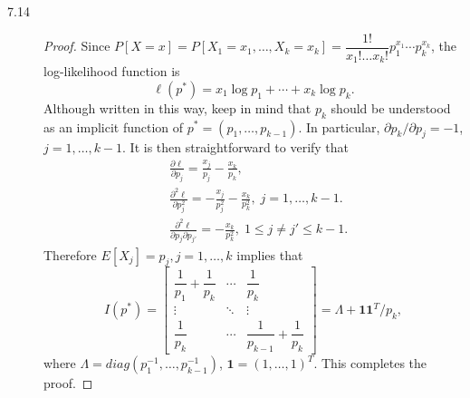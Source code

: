 \documentclass{article}
\newcommand{\real}{\mathbb{R}}
\newcommand{\dd}{\mathop{}\!\mathrm{d}}
\theoremstyle{definition}
\theoremstyle{plain}
\theoremstyle{remark}
\begin{document}
\begin{description}
\item[7.14]
\begin{proof}
Since $P[X = x] = P[X_1 = x_1, \ldots, X_k = x_k] = \dfrac{1!}{x_1!\ldots x_k!}
p_1^{x_1}\cdots p_k^{x_k}$, the log-likelihood function is
\begin{equation*}
    \ell(p^*) = x_1\log p_1 + \cdots + x_k \log p_k.
\end{equation*}
Although written in this way, keep in mind that $p_k$ should be understood 
as an implicit function of $p^* = (p_1, \ldots, p_{k - 1})$. In particular,
$\partial p_k / \partial p_j = -1$, $j = 1, \ldots, k - 1$. It is then 
straightforward to verify that
\begin{align*}
    & \frac{\partial \ell}{\partial p_j} = \frac{x_j}{p_j} - \frac{x_k}{p_k}, \\
    & \frac{\partial^2 \ell}{\partial p_j^2} = -\frac{x_j}{p_j^2}
    - \frac{x_k}{p_k^2}, \; j = 1, \ldots, k - 1. \\
    & \frac{\partial^2 \ell}{\partial p_j\partial p_{j'}} = -\frac{x_k}{p_k^2},
    \; 1 \leq j \neq j' \leq k - 1.
\end{align*}
Therefore $E[X_j] = p_j, j = 1, \ldots, k$ implies that 
\begin{equation*}
    I(p^*) = \begin{bmatrix}
    \dfrac{1}{p_1} + \dfrac{1}{p_k} & \cdots & \dfrac{1}{p_k} \\
    \vdots & \ddots & \vdots \\
    \dfrac{1}{p_k} & \cdots & \dfrac{1}{p_{k - 1}} + \dfrac{1}{p_k} 
    \end{bmatrix} = 
    \Lambda + \bm{1}\bm{1}^T/p_k,
\end{equation*}
where $\Lambda = diag(p_1^{-1}, \ldots, p_{k - 1}^{-1})$, $\bm{1} = (1, \ldots,
1)^T$. This completes the proof.
\end{proof}

\begin{comment}
\item[7.15]
\begin{proof}
Denote the derivative function of $f$ by $g$. Direct calculation shows that (use 
symmetry of $f$ to simplify results):
\begin{equation*}
    I(\bm{\theta}) = 
    \begin{pmatrix}
    A/\theta_2^2 & 0 \\
    0 & (B - 1)/\theta_2^2
    \end{pmatrix},
\end{equation*}
where $A = \int_\real g^2(u)/f(u) \dd u$, $B = \int_\real u^2g^2(u)/f(u) \dd u$. 
\end{proof}
\end{comment}


\end{description}
\end{document}
